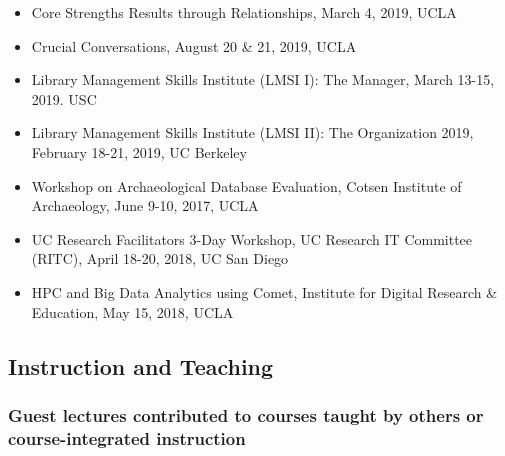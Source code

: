 
\begin{itemize}[label={},leftmargin=!,labelindent=5pt,itemindent=-15pt]
  \item Core Strengths Results through Relationships, March 4, 2019, UCLA
  \item Crucial Conversations, August 20 \& 21, 2019, UCLA
  \item Library Management Skills Institute (LMSI I): The Manager, March 13-15, 2019. USC
  \item Library Management Skills Institute (LMSI II): The Organization 2019, February 18-21, 2019, UC Berkeley
  \item Workshop on Archaeological Database Evaluation, Cotsen Institute of Archaeology, June 9-10, 2017, UCLA
  \item UC Research Facilitators 3-Day Workshop,  UC Research IT Committee (RITC), April 18-20, 2018, UC San Diego
  \item HPC and Big Data Analytics using Comet, Institute for Digital Research \& Education, May 15, 2018, UCLA
\end{itemize}



\subsection{Instruction and Teaching}

\subsubsection{Guest lectures contributed to courses taught by others or course-integrated instruction}

